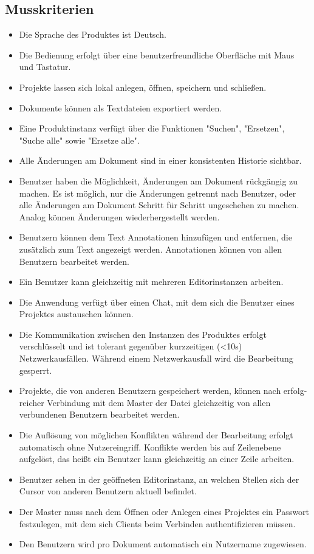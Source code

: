 \documentclass{scrartcl}
\begin{document}
\subsection{Musskriterien}
\begin{itemize}
\item Die Sprache des Produktes ist Deutsch.
\item Die Bedienung erfolgt über eine benutzerfreundliche Oberfläche mit Maus und Tastatur.
\item Projekte lassen sich lokal anlegen, öffnen, speichern und schließen.
\item Dokumente können als Textdateien exportiert werden.
\item Eine Produktinstanz verfügt über die Funktionen "Suchen", "Ersetzen", "Suche alle" sowie "Ersetze alle".
\item Alle Änderungen am Dokument sind in einer konsistenten Historie sichtbar.
\item Benutzer haben die Möglichkeit, Änderungen am Dokument rückgängig zu machen. Es ist möglich, nur die Änderungen getrennt nach Benutzer, oder alle Änderungen am Dokument Schritt für Schritt ungeschehen zu machen. Analog können Änderungen wiederhergestellt werden. 
\item Benutzern können dem Text Annotationen hinzufügen und entfernen, die zusätzlich zum Text angezeigt werden. Annotationen können von allen Benutzern bearbeitet werden.
\item Ein Benutzer kann gleichzeitig mit mehreren Editorinstanzen arbeiten.
\item Die Anwendung verfügt über einen Chat, mit dem sich die Benutzer eines Projektes austauschen können.
\item Die Kommunikation zwischen den Instanzen des Produktes erfolgt verschlüsselt und ist tolerant gegenüber kurzzeitigen (<10s) Netzwerkausfällen. Während einem Netzwerkausfall wird die Bearbeitung gesperrt.
\item Projekte, die von anderen Benutzern gespeichert werden, können nach erfolg-reicher Verbindung mit dem Master der Datei gleichzeitig von allen verbundenen Benutzern bearbeitet werden.
\item Die Auflösung von möglichen Konflikten während der Bearbeitung erfolgt automatisch ohne Nutzereingriff. Konflikte werden bis auf Zeilenebene aufgelöst, das heißt ein Benutzer kann gleichzeitig an einer Zeile arbeiten.
\item Benutzer sehen in der geöffneten Editorinstanz, an welchen Stellen sich der Cursor von anderen Benutzern aktuell befindet.
\item Der Master muss nach dem Öffnen oder Anlegen eines Projektes ein Passwort festzulegen, mit dem sich Clients beim Verbinden authentifizieren müssen.
\item Den Benutzern wird pro Dokument automatisch ein Nutzername zugewiesen.
\end{itemize}
\end{document}
